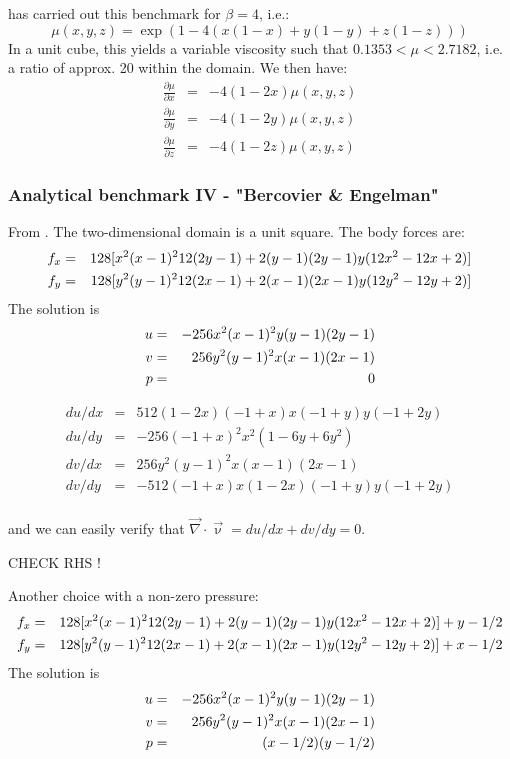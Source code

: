 \cite{busa13} has carried out this benchmark for $\beta=4$, i.e.: 
\[
\mu(x,y,z)=\exp ( 1-4( x(1-x)+y(1-y)+z(1-z)  )  )
\]
In a unit cube, this yields a variable viscosity such that
$0.1353 < \mu <   2.7182$, i.e. a ratio of approx. 20 within the domain. We then have:
\begin{eqnarray}
\frac{\partial \mu}{\partial x}&=&-4(1-2x)\mu(x,y,z)\\
\frac{\partial \mu}{\partial y}&=&-4(1-2y)\mu(x,y,z)\\
\frac{\partial \mu}{\partial z}&=&-4(1-2z)\mu(x,y,z)
\end{eqnarray}



\subsubsection{Analytical benchmark IV \label{mms4} - "Bercovier \& Engelman"}

From \cite{been79}. The two-dimensional domain is a unit square. The body forces are:
\begin{eqnarray}
f_x &=& 128[ x^2(x-1)^2 12 (2y-1) + 2 (y-1)(2y-1)y(12x^2-12x+2)  ] \nonumber\\
f_y &=& 128[ y^2(y-1)^2 12 (2x-1) + 2 (x-1)(2x-1)y(12y^2-12y+2)  ] \nonumber\\
\end{eqnarray}
The solution is
\begin{eqnarray}
u &=& -256x^2(x-1)^2y(y-1)(2y-1) \nonumber\\
v &=&  256y^2(y-1)^2x(x-1)(2x-1) \nonumber\\
p &=& 0 
\end{eqnarray}

\begin{eqnarray}
du/dx &=& 512 (1 - 2x) (-1+x) x(-1+y) y(-1+2y) \\ 
du/dy &=& -256 (-1 + x)^2 x^2 (1 - 6 y + 6 y^2) \\ 
dv/dx &=&  256y^2(y-1)^2x(x-1)(2x-1) \\ 
dv/dy &=& -512 (-1 + x) x (1 - 2 x) (-1 + y) y (-1 + 2 y) \\
\end{eqnarray}

and we can easily verify that $\vec\nabla\cdot\vec\upnu=du/dx+dv/dy=0$.

CHECK RHS !

Another choice with a non-zero pressure:
\begin{eqnarray}
f_x &=& 128[ x^2(x-1)^2 12 (2y-1) + 2 (y-1)(2y-1)y(12x^2-12x+2)  ] + y - 1/2 \nonumber\\
f_y &=& 128[ y^2(y-1)^2 12 (2x-1) + 2 (x-1)(2x-1)y(12y^2-12y+2)  ] + x - 1/2 \nonumber\\
\end{eqnarray}
The solution is
\begin{eqnarray}
u &=& -256x^2(x-1)^2y(y-1)(2y-1) \nonumber\\
v &=&  256y^2(y-1)^2x(x-1)(2x-1) \nonumber\\
p &=& (x-1/2)(y-1/2) 
\end{eqnarray}



